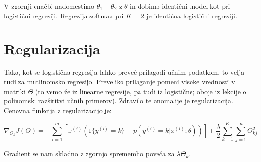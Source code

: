 V zgornji enačbi nadomestimo $\theta_1-\theta_2$ z $\theta$ in dobimo identični model kot pri logistični regresiji. Regresija softmax pri $K=2$ je identična logistični regresiji.

\section{Regularizacija}

Tako, kot se logistična regresija lahko preveč prilagodi učnim podatkom, to velja tudi za mutlinomsko regresijo. Preveliko prilaganje pomeni visoke vrednosti v matriki $\Theta$ (to vemo že iz linearne regresije, pa tudi iz logistične; oboje iz lekcije o polinomski razširitvi učnih primerov). Zdravilo te anomalije je regularizacija. Cenovna funkcija z regularizacijo je:

\begin{equation}
\nabla_{\Theta_k} J(\Theta) = - \sum_{i=1}^{m}{ \left[ x^{(i)} \left( 1\{ y^{(i)} = k\}  - p(y^{(i)} = k | x^{(i)}; \theta) \right) \right] } + \frac{\lambda}{2}\sum_{k=1}^K\sum_{j=1}^n\Theta_{kj}^2
\end{equation}

Gradient se nam skladno z zgornjo spremembo poveča za $\lambda\Theta_k$.

\cleardoublepage
